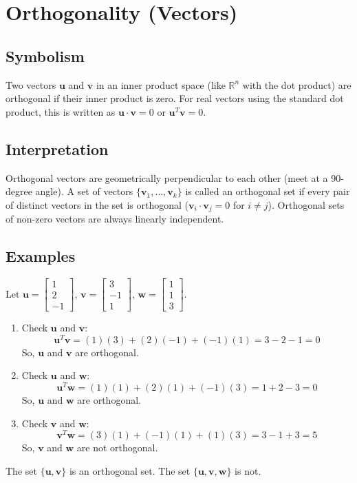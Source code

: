 \documentclass{article}
\newcommand{\vect}[1]{\bm{#1}} %
\newcommand{\R}{\mathbb{R}}    %
\begin{document}
\section{Orthogonality (Vectors)}

\subsection*{Symbolism}
Two vectors $\vect{u}$ and $\vect{v}$ in an inner product space (like $\R^n$ with the dot product) are orthogonal if their inner product is zero. For real vectors using the standard dot product, this is written as $\vect{u} \cdot \vect{v} = 0$ or $\vect{u}^T \vect{v} = 0$.

\subsection*{Interpretation}
Orthogonal vectors are geometrically perpendicular to each other (meet at a 90-degree angle). A set of vectors $\{\vect{v}_1, \dots, \vect{v}_k\}$ is called an orthogonal set if every pair of distinct vectors in the set is orthogonal ($\vect{v}_i \cdot \vect{v}_j = 0$ for $i \neq j$). Orthogonal sets of non-zero vectors are always linearly independent.

\subsection*{Examples}
Let $\vect{u} = \begin{bmatrix} 1 \\ 2 \\ -1 \end{bmatrix}$, $\vect{v} = \begin{bmatrix} 3 \\ -1 \\ 1 \end{bmatrix}$, $\vect{w} = \begin{bmatrix} 1 \\ 1 \\ 3 \end{bmatrix}$.
\begin{enumerate}
    \item Check $\vect{u}$ and $\vect{v}$:
    \[ \vect{u}^T \vect{v} = (1)(3) + (2)(-1) + (-1)(1) = 3 - 2 - 1 = 0 \]
    So, $\vect{u}$ and $\vect{v}$ are orthogonal.
    \item Check $\vect{u}$ and $\vect{w}$:
    \[ \vect{u}^T \vect{w} = (1)(1) + (2)(1) + (-1)(3) = 1 + 2 - 3 = 0 \]
    So, $\vect{u}$ and $\vect{w}$ are orthogonal.
    \item Check $\vect{v}$ and $\vect{w}$:
    \[ \vect{v}^T \vect{w} = (3)(1) + (-1)(1) + (1)(3) = 3 - 1 + 3 = 5 \]
    So, $\vect{v}$ and $\vect{w}$ are not orthogonal.
\end{enumerate}
The set $\{\vect{u}, \vect{v}\}$ is an orthogonal set. The set $\{\vect{u}, \vect{v}, \vect{w}\}$ is not.
\end{document}
